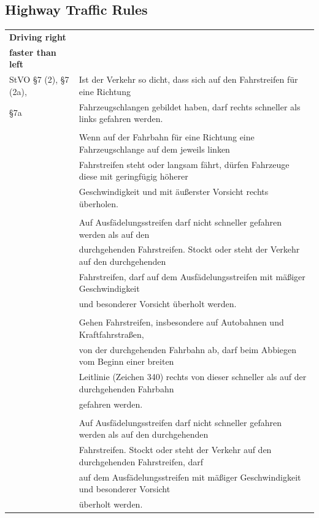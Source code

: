 \subsection{Highway Traffic Rules}
\label{sec:highway_rules}
\begin{table}[H]
	\centering
	\begin{tabular}[t]{ll}
		\toprule
		\textbf{Driving right} & \\
		\textbf{faster than left} &\\
		\midrule
		StVO \S 7 (2), \S 7 (2a),  & Ist der Verkehr so dicht, dass sich auf den Fahrstreifen für eine Richtung \\
		\S 7a & Fahrzeugschlangen gebildet haben, darf rechts schneller als links gefahren werden.\\
		& \\
		& Wenn auf der Fahrbahn für eine Richtung eine Fahrzeugschlange auf dem jeweils linken \\ 
		& Fahrstreifen steht oder langsam fährt, dürfen Fahrzeuge diese mit geringfügig höherer \\ 
		& Geschwindigkeit und mit äußerster Vorsicht rechts überholen. \\ 
		& \\
		& Auf Ausfädelungsstreifen darf nicht schneller gefahren werden als auf den \\  
		& durchgehenden Fahrstreifen. Stockt oder steht der Verkehr auf den durchgehenden \\ 
		& Fahrstreifen, darf auf dem Ausfädelungsstreifen mit mäßiger Geschwindigkeit  \\
		& und besonderer Vorsicht überholt werden. \\
		& \\
		& Gehen Fahrstreifen, insbesondere auf Autobahnen und Kraftfahrstraßen, \\
		& von der durchgehenden Fahrbahn ab, darf beim Abbiegen vom Beginn einer breiten \\
		& Leitlinie (Zeichen 340) rechts von dieser schneller als auf der durchgehenden Fahrbahn \\
		& gefahren werden. \\ 
		& \\
		& Auf Ausfädelungsstreifen darf nicht schneller gefahren werden als auf den durchgehenden \\ 
		& Fahrstreifen. Stockt oder steht der Verkehr auf den durchgehenden Fahrstreifen, darf \\ 
		& auf dem Ausfädelungsstreifen mit mäßiger Geschwindigkeit und besonderer Vorsicht \\
		& überholt werden. \\
		

\end{tabular}
\end{table}
